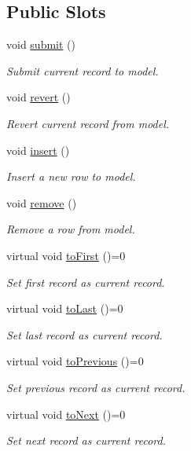 \subsection*{Public Slots}
\begin{DoxyCompactItemize}
\item 
void \hyperlink{classmdt_abstract_sql_widget_a6678c45b0d46eb163f5b09d79ed001b5}{submit} ()
\begin{DoxyCompactList}\small\item\em Submit current record to model. \end{DoxyCompactList}\item 
void \hyperlink{classmdt_abstract_sql_widget_a3108b336f4c832cb0a5b3a830fff9ce0}{revert} ()
\begin{DoxyCompactList}\small\item\em Revert current record from model. \end{DoxyCompactList}\item 
void \hyperlink{classmdt_abstract_sql_widget_a850df045ea95b8c15ddd95ae771ef785}{insert} ()
\begin{DoxyCompactList}\small\item\em Insert a new row to model. \end{DoxyCompactList}\item 
void \hyperlink{classmdt_abstract_sql_widget_a748f85ff383d3f11fda4db7f931edb1c}{remove} ()
\begin{DoxyCompactList}\small\item\em Remove a row from model. \end{DoxyCompactList}\item 
virtual void \hyperlink{classmdt_abstract_sql_widget_aaa27731864dbb9123ec6765dd21feb7f}{toFirst} ()=0
\begin{DoxyCompactList}\small\item\em Set first record as current record. \end{DoxyCompactList}\item 
virtual void \hyperlink{classmdt_abstract_sql_widget_a681cc6234976eaa2f0e158248569b502}{toLast} ()=0
\begin{DoxyCompactList}\small\item\em Set last record as current record. \end{DoxyCompactList}\item 
virtual void \hyperlink{classmdt_abstract_sql_widget_a342b13a8258536d228f8522dae2b9df7}{toPrevious} ()=0
\begin{DoxyCompactList}\small\item\em Set previous record as current record. \end{DoxyCompactList}\item 
virtual void \hyperlink{classmdt_abstract_sql_widget_a8ed6bb811c992fcc8bba8da9f675cd88}{toNext} ()=0
\begin{DoxyCompactList}\small\item\em Set next record as current record. \end{DoxyCompactList}\end{DoxyCompactItemize}
